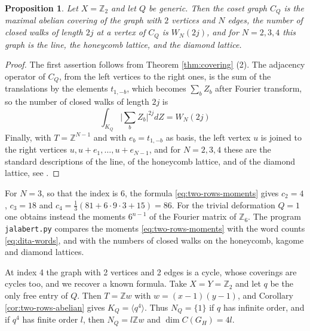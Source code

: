 \documentclass[11pt,reqno]{amsart}
\newtheorem{prop}[thm]{Proposition}
\theoremstyle{definition}
\numberwithin{equation}{section}
\begin{document}
\begin{prop}\label{prop:two-rows-graph}
Let $X=\mathbb Z_2$ and let $Q$ be generic. Then the coset graph $C_Q$ is the maximal abelian covering of the graph with $2$ vertices and $N$ edges, the number of closed walks of length $2j$ at a vertex of $C_Q$ is $W_N(2j)$, and for $N=2,3,4$ this graph is the line, the honeycomb lattice, and the diamond lattice.
\end{prop}
\begin{proof}
The first assertion follows from Theorem \ref{thm:covering} (2). The adjacency operator of $C_Q$, from the left vertices to the right ones, is the sum of the translations by the elements $t_{1,-b}$, which becomes $\sum_bZ_b$ after Fourier transform, so the number of closed walks of length $2j$ is
$$\int_{K_Q}\Big|\sum_bZ_b\Big|^{2j}dZ=W_N(2j)$$
Finally, with $T=\mathbb Z^{N-1}$ and with $e_b=t_{1,-b}$ as basis, the left vertex $u$ is joined to the right vertices $u,u+e_1,\ldots,u+e_{N-1}$, and for $N=2,3,4$ these are the standard descriptions of the line, of the honeycomb lattice, and of the diamond lattice, see \cite{Sun13}.
\end{proof}

For $N=3$, so that the index is $6$, the formula \eqref{eq:two-rows-moments} gives $c_2=4$, $c_3=18$ and $c_4=\frac13(81+6\cdot9\cdot3+15)=86$. For the trivial deformation $Q=1$ one obtains instead the moments $6^{n-1}$ of the Fourier matrix of $\mathbb Z_6$. The program \texttt{jalabert.py} compares the moments \eqref{eq:two-rows-moments} with the word counts \eqref{eq:dita-words}, and with the numbers of closed walks on the honeycomb, kagome and diamond lattices.

At index 4 the graph with 2 vertices and 2 edges is a cycle, whose coverings are cycles too, and we recover a known formula. Take $X=Y=\mathbb Z_2$ and let $q$ be the only free entry of $Q$. Then $T=\mathbb Z w$ with $w=(x-1)(y-1)$, and Corollary \ref{cor:two-rows-abelian} gives $K_Q=\langle q^4\rangle$. Thus $N_Q=\{1\}$ if $q$ has infinite order, and if $q^4$ has finite order $l$, then $N_Q=l\mathbb Z w$ and $\dim C(G_H)=4l$.
\end{document}
